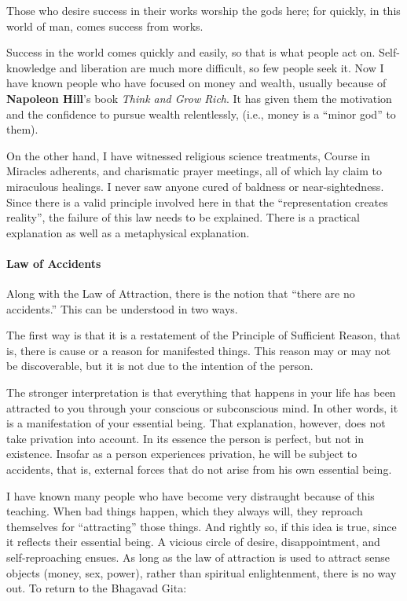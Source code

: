 \begin{quotex}
Those who desire success in their works worship the gods here; for quickly, in this world of man, comes success from works. 

\end{quotex}
Success in the world comes quickly and easily, so that is what people act on. Self-knowledge and liberation are much more difficult, so few people seek it. Now I have known people who have focused on money and wealth, usually because of \textbf{Napoleon Hill}'s book \emph{Think and Grow Rich}. It has given them the motivation and the confidence to pursue wealth relentlessly, (i.e., money is a “minor god” to them).

On the other hand, I have witnessed religious science treatments, Course in Miracles adherents, and charismatic prayer meetings, all of which lay claim to miraculous healings. I never saw anyone cured of baldness or near-sightedness. Since there is a valid principle involved here in that the “representation creates reality”, the failure of this law needs to be explained. There is a practical explanation as well as a metaphysical explanation.

\paragraph{Law of Accidents}
Along with the Law of Attraction, there is the notion that “there are no accidents.” This can be understood in two ways.

The first way is that it is a restatement of the Principle of Sufficient Reason, that is, there is cause or a reason for manifested things. This reason may or may not be discoverable, but it is not due to the intention of the person.

The stronger interpretation is that everything that happens in your life has been attracted to you through your conscious or subconscious mind. In other words, it is a manifestation of your essential being. That explanation, however, does not take privation into account. In its essence the person is perfect, but not in existence. Insofar as a person experiences privation, he will be subject to accidents, that is, external forces that do not arise from his own essential being.

I have known many people who have become very distraught because of this teaching. When bad things happen, which they always will, they reproach themselves for “attracting” those things. And rightly so, if this idea is true, since it reflects their essential being. A vicious circle of desire, disappointment, and self-reproaching ensues. As long as the law of attraction is used to attract sense objects (money, sex, power), rather than spiritual enlightenment, there is no way out. To return to the Bhagavad Gita:

